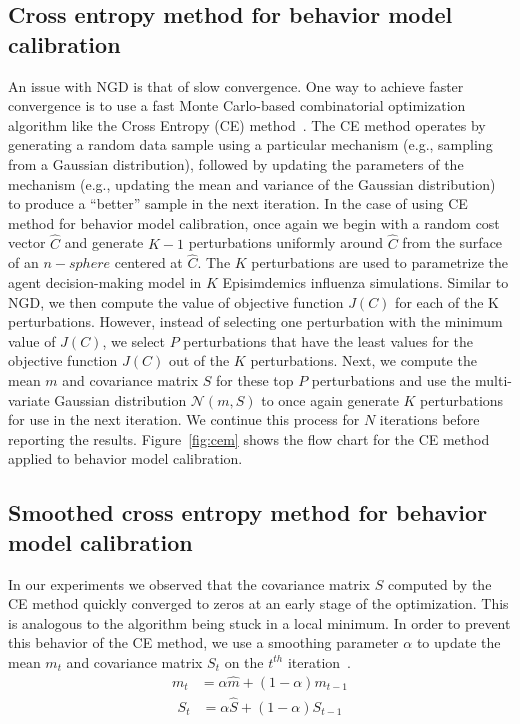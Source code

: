 \documentclass[doublespace]{VTthesis}
\begin{document}
    \subsection{Cross entropy method for behavior model calibration}
    An issue with NGD is that of slow convergence. One way to achieve faster convergence is to use a fast Monte Carlo-based combinatorial optimization algorithm like the Cross Entropy (CE) method~\cite{kroese2013cross,stulp2012path}. The CE method operates by generating a random data sample using a particular mechanism (e.g., sampling from a Gaussian distribution), followed by updating the parameters of the mechanism (e.g., updating the mean and variance of the Gaussian distribution) to produce a ``better'' sample in the next iteration. In the case of using CE method for behavior model calibration, once again we begin with a random cost vector $\hat{C}$ and generate $K-1$ perturbations uniformly around $\hat{C}$ from the surface of an $n-sphere$ centered at $\hat{C}$. The $K$ perturbations are used to parametrize the agent decision-making model in $K$ Episimdemics influenza simulations. Similar to NGD, we then compute the value of objective function $J(C)$ for each of the K perturbations. However, instead of selecting one perturbation with the minimum value of $J(C)$, we select $P$ perturbations that have the least values for the objective function $J(C)$ out of the $K$ perturbations. Next, we compute the mean $m$ and covariance matrix $S$ for these top $P$ perturbations and use the multi-variate Gaussian distribution $\mathcal{N}(m,S)$ to once again generate $K$ perturbations for use in the next iteration. We continue this process for $N$ iterations before reporting the results. Figure~\ref{fig:cem} shows the flow chart for the CE method applied to behavior model calibration.
    
    \subsection{Smoothed cross entropy method for behavior model calibration}
    In our experiments we observed that the covariance matrix $S$ computed by the CE method quickly converged to zeros at an early stage of the optimization. This is analogous to the algorithm being stuck in a local minimum. In order to prevent this behavior of the CE method, we use a smoothing parameter $\alpha$ to update the mean $m_t$ and covariance matrix $S_t$ on the $t^{th}$ iteration~\cite{mannor2003cross}.
    \begin{align}
        m_t &= \alpha  \hat{m} + (1-\alpha)  m_{t-1}
    		\label{eqn:smean}
    \end{align}
    \begin{align}
    		S_t &= \alpha  \hat{S} + (1-\alpha)  S_{t-1}
    		\label{eqn:scovmat}
    \end{align}
    
\end{document}
